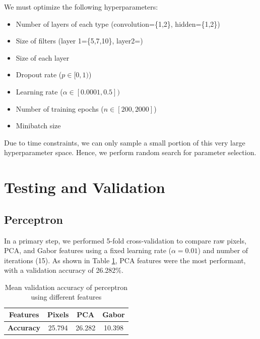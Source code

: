 \documentclass{acm_proc_article-sp}
\begin{document}
We must optimize the following hyperparameters: 
\begin{itemize}
\item Number of layers of each type (convolution=\{1,2\}, hidden=\{1,2\})
\item Size of filters (layer 1=\{5,7,10\}, layer2=)
\item Size of each layer 
\item Dropout rate ($p \in [0,1)$)
\item Learning rate ($\alpha \in [0.0001, 0.5])$
\item Number of training epochs ($n \in [200, 2000]$)
\item Minibatch size
\end{itemize}


Due to time constraints, we can only sample a small portion of this very large hyperparameter space. Hence, we perform random search for parameter selection.

\section{Testing and Validation}%

\subsection{Perceptron}
In a primary step, we performed 5-fold cross-validation to compare raw pixels, PCA, and Gabor features using a fixed learning rate ($\alpha = 0.01$) and number of iterations (15). As shown in Table \ref{tab:perc-features}, PCA features were the most performant, with a validation accuracy of 26.282\%.
\begin{table}[h!]
  \centering
  \begin{tabular}{|c||c|c|c| }
    \hline
    {\bfseries Features} & Pixels & PCA & Gabor \\
    \hline
    {\bfseries Accuracy} & 25.794 & 26.282 & 10.398 \\
    \hline
  \end{tabular}
  \caption{Mean validation accuracy of perceptron using different features}
  \label{tab:perc-features}
\end{table}
\end{document}
